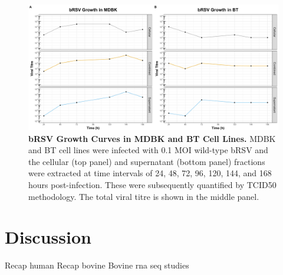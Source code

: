 \begin{figure}
    \centering
    \includegraphics[width=1\linewidth]{07. Chapter 2/Figs/01. Technologies/01. growth_curves.pdf}
    \caption[bRSV Growth Curves in MDBK and BT Cell Lines.]{\textbf{bRSV Growth Curves in MDBK and BT Cell Lines.} MDBK and BT cell lines were infected with 0.1 MOI wild-type bRSV and the cellular (top panel) and supernatant (bottom panel) fractions were extracted at time intervals of 24, 48, 72, 96, 120, 144, and 168 hours post-infection. These were subsequently quantified by TCID50 methodology. The total viral titre is shown in the middle panel.}
    \label{bRSV growth curves in MDBK and BT cell lines}
\end{figure}




\section{Discussion} \label{Discussion Chapter2}
Recap human \newline
Recap bovine \newline
Bovine rna seq studies



